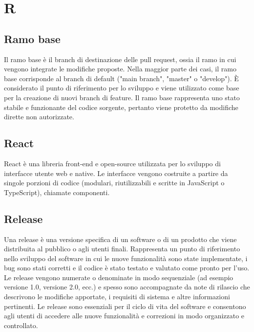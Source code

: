 \section{R}

\vspace{2em}
\subsection*{Ramo base}
\par Il ramo base è il branch di destinazione delle pull request, ossia il ramo in cui vengono integrate le modifiche proposte. Nella maggior parte dei casi, il ramo base corrisponde al branch di default ("main branch", "master" o "develop"). È considerato il punto di riferimento per lo sviluppo e viene utilizzato come base per la creazione di nuovi branch di feature. Il ramo base rappresenta uno stato stabile e funzionante del codice sorgente, pertanto viene protetto da modifiche dirette non autorizzate. 

\vspace{2em}
\subsection*{React}
\par React è una libreria front-end e open-source utilizzata per lo sviluppo di interfacce utente web e native. Le interfacce vengono costruite a partire da singole porzioni di codice (modulari, riutilizzabili e scritte in JavaScript o TypeScript), chiamate componenti.

\vspace{2em}
\subsection*{Release}
\par Una release è una versione specifica di un software o di un prodotto che viene distribuita al pubblico o agli utenti finali. Rappresenta un punto di riferimento nello sviluppo del software in cui le nuove funzionalità sono state implementate, i bug sono stati corretti e il codice è stato testato e valutato come pronto per l'uso. Le release vengono numerate o denominate in modo sequenziale (ad esempio versione 1.0, versione 2.0, ecc.) e spesso sono accompagnate da note di rilascio che descrivono le modifiche apportate, i requisiti di sistema e altre informazioni pertinenti. Le release sono essenziali per il ciclo di vita del software e consentono agli utenti di accedere alle nuove funzionalità e correzioni in modo organizzato e controllato.

